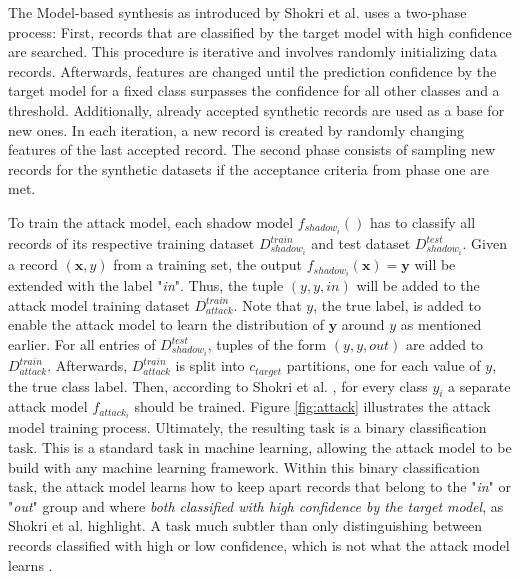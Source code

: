 \documentclass[runningheads]{llncs}
\begin{document}
The Model-based synthesis as introduced by Shokri et al. \cite{shokri2017membership} uses a two-phase process: First, records that are classified by the target model with high confidence are searched. This procedure is iterative and involves randomly initializing data records. Afterwards, features are changed until the prediction confidence by the target model for a fixed class surpasses the confidence for all other classes and a threshold. Additionally, already accepted synthetic records are used as a base for new ones. In each iteration, a new record is created by randomly changing features of the last accepted record. The second phase consists of sampling new records for the synthetic datasets if the acceptance criteria from phase one are met.
\par
To train the attack model, each shadow model $f_{shadow_i}()$ has to classify all records of its respective training dataset $D_{shadow_i}^{train}$ and test dataset $D_{shadow_i}^{test}$. Given a record $(\textbf{x}, y)$ from a training set, the output $f_{shadow_i}(\textbf{x}) = \textbf{y}$ will be extended with the label "\textit{in}". Thus, the tuple $(y, \textit{y}, in)$ will be added to the attack model training dataset $D_{attack}^{train}$. Note that $y$, the true label, is added to enable the attack model to learn the distribution of $\textbf{y}$ around $y$ as mentioned earlier. For all entries of $D_{shadow_i}^{test}$, tuples of the form $(y, \textit{y}, out)$ are added to $D_{attack}^{train}$. Afterwards, $D_{attack}^{train}$ is split into $c_{target}$ partitions, one for each value of $y$, the true class label. Then, according to Shokri et al. \cite{shokri2017membership}, for   every class $y_i$ a separate attack model $f_{attack_i}$ should be trained. Figure \ref{fig:attack} illustrates the attack model training process. Ultimately, the resulting task is a binary classification task. This is a standard task in machine learning, allowing the attack model to be build with any machine learning framework. Within this binary classification task, the attack model learns how to keep apart records that belong to the "\textit{in}" or "\textit{out}" group and where \textit{both classified with high confidence by the target model}, as Shokri et al. \cite{shokri2017membership} highlight. A task much subtler than only distinguishing between records classified with high or low confidence, which is not what the attack model learns \cite{shokri2017membership}.
\end{document}
